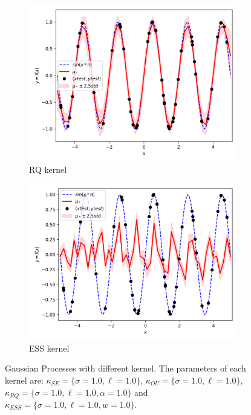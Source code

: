 \documentclass{article}
\begin{document}
\begin{figure}[ht]
\begin{subfigure}{.5\textwidth}
    \includegraphics[width=\linewidth]{kernels/posterior/kernelRQ.png}
    \caption{RQ kernel}
    \label{fig:kernelRQ50}
  \end{subfigure}
  \begin{subfigure}{.5\textwidth}
    \centering
    \includegraphics[width=\linewidth]{kernels/posterior/kernelESS.png}
    \caption{ESS kernel}
    \label{fig:kernelESS50}
  \end{subfigure}
  \caption{Gaussian Processes with different kernel. The parameters of each kernel are: $\kappa_{SE} = \{\sigma=1.0, \ell=1.0\}$, $\kappa_{OU} = \{\sigma=1.0, \ell=1.0\}$, $\kappa_{RQ} = \{\sigma=1.0, \ell=1.0, \alpha=1.0\}$ and $\kappa_{ESS} = \{\sigma=1.0, \ell=1.0, w=1.0\}$.}
  \label{fig:posterior_kernels}
\end{figure}
\end{document}
